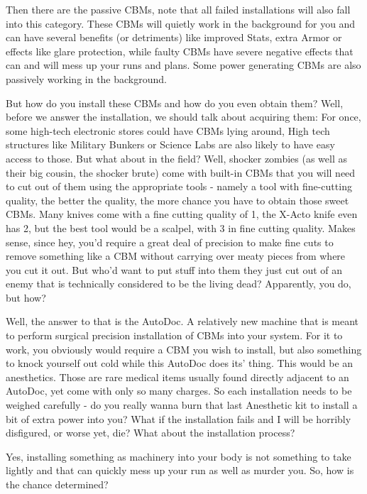 \documentclass[11pt]{report}
\begin{document}
Then there are the passive CBMs, note that all failed installations will also fall into this category. These CBMs will quietly work in the background for you and can have several benefits (or detriments) like improved Stats, extra Armor or effects like glare protection, while faulty CBMs have severe negative effects that can and will mess up your runs and plans. Some power generating CBMs are also passively working in the background.

But how do you install these CBMs and how do you even obtain them? Well, before we answer the installation, we should talk about acquiring them: For once, some high-tech electronic stores could have CBMs lying around, High tech structures like Military Bunkers or Science Labs are also likely to have easy access to those. But what about in the field? Well, shocker zombies (as well as their big cousin, the shocker brute) come with built-in CBMs that you will need to cut out of them using the appropriate tools - namely a tool with fine-cutting quality, the better the quality, the more chance you have to obtain those sweet CBMs. Many knives come with a fine cutting quality of 1, the X-Acto knife even has 2, but the best tool would be a scalpel, with 3 in fine cutting quality. Makes sense, since hey, you'd require a great deal of precision to make fine cuts to remove something like a CBM without carrying over meaty pieces from where you cut it out. But who'd want to put stuff into them they just cut out of an enemy that is technically considered to be the living dead? Apparently, you do, but how?

Well, the answer to that is the AutoDoc. A relatively new machine that is meant to perform surgical precision installation of CBMs into your system. For it to work, you obviously would require a CBM you wish to install, but also something to knock yourself out cold while this AutoDoc does its' thing. This would be an anesthetics. Those are rare medical items usually found directly adjacent to an AutoDoc, yet come with only so many charges. So each installation needs to be weighed carefully - do you really wanna burn that last Anesthetic kit to install a bit of extra power into you? What if the installation fails and I will be horribly disfigured, or worse yet, die? What about the installation process?

Yes, installing something as machinery into your body is not something to take lightly and that can quickly mess up your run as well as murder you. So, how is the chance determined?
\end{document}
